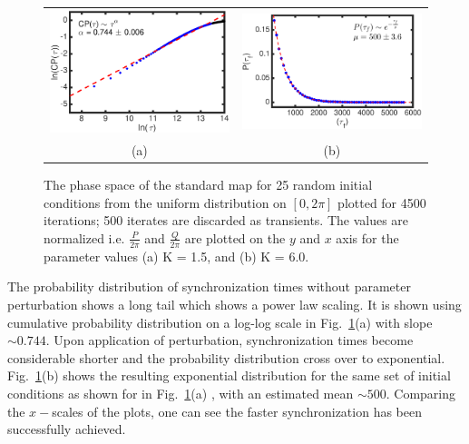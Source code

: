 \documentclass[preprint,showpacs,preprintnumbers,amsmath,amssymb]{revtex4-1}
\begin{document}
 \begin{figure}[h]
\begin{tabular}{cc}
\includegraphics[scale=0.45]{Normal_Sync.eps}&
\includegraphics[scale=0.45]{Fast_sync_dist.eps}\\
(a) & (b)
\end{tabular}{}
\caption{\label{fig:sync_time_dist} \footnotesize The phase space of the standard map for 25 random initial conditions from the uniform distribution on $[0,2\pi]$ plotted for 4500 iterations; 500 iterates are discarded as transients. The values are normalized i.e. $\frac{P}{2\pi} $ and $\frac{Q}{2\pi}$ are plotted on the $y$ and $x$ axis for the parameter values (a)  K = 1.5, and (b) K = 6.0.}
\end{figure}

The probability distribution of synchronization times without parameter perturbation shows a long tail which shows a power law scaling. It is shown using cumulative probability distribution on a log-log scale in Fig.~\ref{fig:sync_time_dist}(a) with slope $\sim 0.744$. Upon application of perturbation, synchronization times become considerable shorter and the probability distribution cross over to exponential. Fig.~\ref{fig:sync_time_dist}(b) shows the resulting exponential distribution for the same set of initial conditions as shown for in Fig.~\ref{fig:sync_time_dist}(a) , with an estimated mean $\sim500$. Comparing the $x-$scales of the plots, one can see the faster synchronization has been successfully achieved.  
\end{document}
